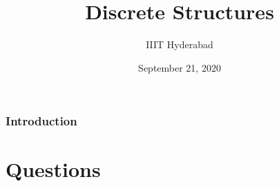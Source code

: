 \documentclass[xcolor=svgnames]{beamer}
\title[Discrete Structures]{Discrete Structures} %
\author{IIIT Hyderabad} %
\institute[] %
{
Monsoon 2020 \\ %
\medskip
\textit{Tutorial 2} %
}
\date{September 21, 2020} %
\begin{document}
\begin{frame}
\titlepage %
\end{frame}

\begin{frame}
\frametitle{Introduction} %
\tableofcontents %
\end{frame}



\section{Questions}

\end{document}

